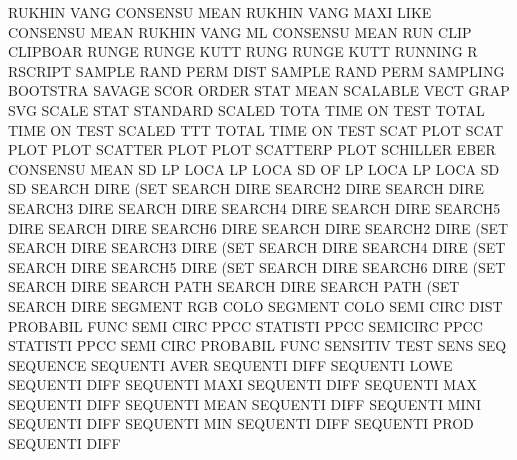 RUKHIN   VANG                           CONSENSU MEAN
RUKHIN   VANG MAXI LIKE                 CONSENSU MEAN
RUKHIN   VANG ML                        CONSENSU MEAN
RUN      CLIP                           CLIPBOAR
RUNGE                                   RUNGE    KUTT
RUNG                                    RUNGE    KUTT
RUNNING  R                              RSCRIPT
SAMPLE   RAND PERM DIST                 SAMPLE   RAND PERM
SAMPLING                                BOOTSTRA
SAVAGE   SCOR                           ORDER    STAT MEAN
SCALABLE VECT GRAP                      SVG
SCALE    STAT                           STANDARD
SCALED   TOTA TIME ON   TEST            TOTAL    TIME ON   TEST
SCALED   TTT                            TOTAL    TIME ON   TEST
SCAT                                    PLOT
SCAT     PLOT                           PLOT
SCATTER  PLOT                           PLOT
SCATTERP                                PLOT
SCHILLER EBER                           CONSENSU MEAN
SD       LP   LOCA                      LP       LOCA
SD       OF   LP   LOCA                 LP       LOCA
SD                                      SD
SEARCH   DIRE (SET                      SEARCH   DIRE
SEARCH2  DIRE                           SEARCH   DIRE
SEARCH3  DIRE                           SEARCH   DIRE
SEARCH4  DIRE                           SEARCH   DIRE
SEARCH5  DIRE                           SEARCH   DIRE
SEARCH6  DIRE                           SEARCH   DIRE
SEARCH2  DIRE (SET                      SEARCH   DIRE
SEARCH3  DIRE (SET                      SEARCH   DIRE
SEARCH4  DIRE (SET                      SEARCH   DIRE
SEARCH5  DIRE (SET                      SEARCH   DIRE
SEARCH6  DIRE (SET                      SEARCH   DIRE
SEARCH   PATH                           SEARCH   DIRE
SEARCH   PATH (SET                      SEARCH   DIRE
SEGMENT  RGB  COLO                      SEGMENT  COLO
SEMI     CIRC DIST                      PROBABIL FUNC
SEMI     CIRC PPCC                      STATISTI PPCC
SEMICIRC PPCC                           STATISTI PPCC
SEMI     CIRC                           PROBABIL FUNC
SENSITIV                                TEST     SENS
SEQ                                     SEQUENCE
SEQUENTI AVER                           SEQUENTI DIFF
SEQUENTI LOWE                           SEQUENTI DIFF
SEQUENTI MAXI                           SEQUENTI DIFF
SEQUENTI MAX                            SEQUENTI DIFF
SEQUENTI MEAN                           SEQUENTI DIFF
SEQUENTI MINI                           SEQUENTI DIFF
SEQUENTI MIN                            SEQUENTI DIFF
SEQUENTI PROD                           SEQUENTI DIFF

